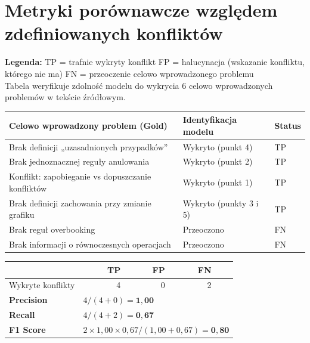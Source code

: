 \documentclass[12pt,a4paper]{article}
\newcommand{\tp}[1]{\colorbox{tpcolor}{\small #1}}
\newcommand{\fp}[1]{\colorbox{fpcolor}{\small #1}}
\newcommand{\fn}[1]{\colorbox{fncolor}{\small #1}}
\begin{document}
\newpage

\section{Metryki porównawcze względem zdefiniowanych konfliktów}

\begin{mdframed}[backgroundcolor=metabg, linewidth=0pt, innerleftmargin=10pt, innerrightmargin=10pt, innertopmargin=8pt, innerbottommargin=8pt]
\small
\textbf{Legenda:} \tp{TP} = trafnie wykryty konflikt \quad \fp{FP} = halucynacja (wskazanie konfliktu, którego nie ma) \quad \fn{FN} = przeoczenie celowo wprowadzonego problemu\\[0.3em]
Tabela weryfikuje zdolność modelu do wykrycia 6 celowo wprowadzonych problemów w tekście źródłowym.
\end{mdframed}

\vspace{0.8em}

\begin{tabular}{p{7cm} p{6cm} l}
\toprule
\textbf{Celowo wprowadzony problem (Gold)} & \textbf{Identyfikacja modelu} & \textbf{Status} \\
\midrule
Brak definicji „uzasadnionych przypadków” & Wykryto (punkt 4) & \tp{TP} \\
Brak jednoznacznej reguły anulowania & Wykryto (punkt 2) & \tp{TP} \\
Konflikt: zapobieganie vs dopuszczanie konfliktów & Wykryto (punkt 1) & \tp{TP} \\
Brak definicji zachowania przy zmianie grafiku & Wykryto (punkty 3 i 5) & \tp{TP} \\
\midrule
Brak reguł overbooking & Przeoczono & \fn{FN} \\
Brak informacji o równoczesnych operacjach & Przeoczono & \fn{FN} \\
\bottomrule
\end{tabular}

\vspace{1em}
\begin{tabular}{lrrrr}
\toprule
& \textbf{TP} & \textbf{FP} & \textbf{FN} & \\
\midrule
Wykryte konflikty & 4 & 0 & 2 & \\
\midrule
\textbf{Precision} & \multicolumn{4}{l}{$4 / (4+0) = \mathbf{1{,}00}$} \\
\textbf{Recall}    & \multicolumn{4}{l}{$4 / (4+2) = \mathbf{0{,}67}$} \\
\textbf{F1 Score}  & \multicolumn{4}{l}{$2 \times 1{,}00 \times 0{,}67 / (1{,}00+0{,}67) = \mathbf{0{,}80}$} \\
\bottomrule
\end{tabular}
\end{document}
